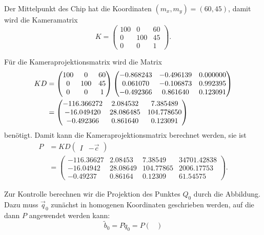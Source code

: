 \begin{loesung}
\begin{teilaufgaben}
\item Der Mittelpunkt des Chip hat die Koordinaten $(m_x,m_y)=(60,45)$,
damit wird die Kameramatrix
\[
K
=
\begin{pmatrix}
100&  0&60\\
  0&100&45\\
  0&  0& 1
\end{pmatrix}.
\]
\item Für die Kameraprojektionsmatrix wird die Matrix
\begin{align}
KD
&=
\begin{pmatrix}
100&  0&60\\
  0&100&45\\
  0&  0& 1
\end{pmatrix}
\begin{pmatrix}
  -0.868243& -0.496139&  0.000000\\
   0.061070& -0.106873&  0.992395\\
  -0.492366&  0.861640&  0.123091
\end{pmatrix}
\notag
\\
&=
\begin{pmatrix}
  -116.366272&     2.084532&     7.385489\\
   -16.049420&    28.086485&   104.778650\\
    -0.492366&     0.861640&     0.123091
\end{pmatrix}
\label{60000001:kd}
\end{align}
benötigt.
Damit kann die Kameraprojektionsmatrix berechnet werden, sie ist
\begin{align*}
P
&=
KD\begin{pmatrix}I&-\vec c\end{pmatrix}
\\
&=
\begin{pmatrix}
  -116.36627&  2.08453&   7.38549& 34701.42838\\
   -16.04942& 28.08649& 104.77865&  2006.17753\\
    -0.49237&  0.86164&   0.12309&    61.54575
\end{pmatrix}.
\end{align*}
\item
Zur Kontrolle berechnen wir die Projektion des Punktes $Q_0$ durch die
Abbildung. 
Dazu muss $\vec q_0$ zunächst in homogenen Koordinaten geschrieben werden,
auf die dann $P$ angewendet werden kann:
\[
\tilde b_0 = 
P\tilde q_0
=
P
\begin{pmatrix}

\end{pmatrix}\]
\end{teilaufgaben}
\end{loesung}
